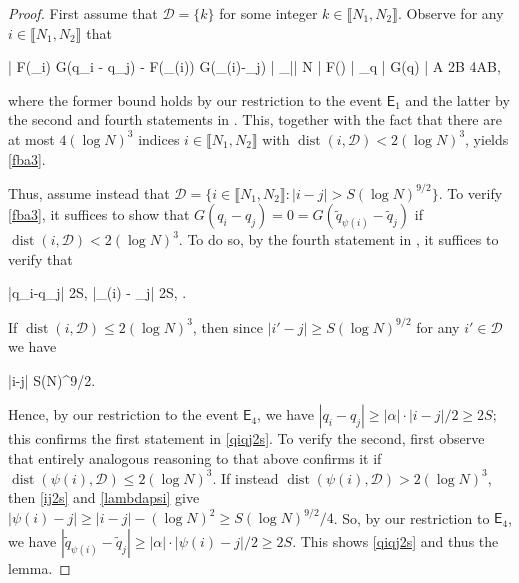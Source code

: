 \documentclass{amsart}
\numberwithin{equation}{section}
\DeclareMathOperator{\dist}{dist}
\theoremstyle{remark}
\theoremstyle{definition}
\begin{document}
	\begin{proof} 
		
		
		
		First assume that $\mathcal{D} = \{ k \}$ for some integer $k \in \llbracket N_1, N_2 \rrbracket$. Observe for any $i \in \llbracket N_1, N_2 \rrbracket$ that 
		\begin{flalign*} 
			\big| F(\Lambda_i) \cdot G(q_i - q_j) - F(\tilde{\Lambda}_{\psi(i)}) \cdot G(_{\psi(i)}-_j) \big|  \displaystyle\sup_{|\lambda| \le \log N} | F(\lambda) | \cdot \displaystyle\sup_{q \in {}} | G(q) |  \cdot A \cdot 2B \le 4AB,
		\end{flalign*}
		
		\noindent where the former bound holds by our restriction to the event $\mathsf{E}_1$ and the latter by the second and fourth statements in . This, together with the fact  that there are at most $4(\log N)^3$ indices $i \in \llbracket N_1, N_2 \rrbracket$ with $\dist (i, \mathcal{D}) < 2 (\log N)^3$, yields \eqref{fba3}.
		
		Thus, assume instead that $\mathcal{D} = \{ i \in \llbracket N_1, N_2 \rrbracket : |i-j| > S(\log N)^{9/2} \}$. To verify \eqref{fba3}, it suffices to show that $G(q_i - q_j) = 0 = G(\tilde{q}_{\psi(i)}-\tilde{q}_j)$ if $\dist (i, \mathcal{D}) < 2 (\log N)^3$. To do so, by the fourth statement in , it suffices to verify that 
		\begin{flalign} 
			\label{qiqj2s} 
			|q_i-q_j| \ge 2S, \qquad {} \qquad |_{\psi(i)} - _j| \ge 2S, \qquad \text{if $\dist (i, \mathcal{D}) \le 2(\log N)^3$}.
		\end{flalign}
		
		\noindent If $\dist (i, \mathcal{D}) \le 2(\log N)^3$, then since $|i'-j| \ge S(\log N)^{9/2}$ for any $i' \in \mathcal{D}$ we have 
		\begin{flalign}
			\label{ij2s}
			|i-j| \ge \displaystyle{} \cdot S(\log N)^{9/2}.
		\end{flalign} 
		
		\noindent Hence, by our restriction to the event $\mathsf{E}_4$, we have $|q_i - q_j| \ge |\alpha| \cdot |i-j| / 2 \ge 2 S$; this confirms the first statement in \eqref{qiqj2s}. To verify the second, first observe that entirely analogous reasoning to that above confirms it if $\dist (\psi(i), \mathcal{D}) \le 2 (\log N)^3$. If instead $\dist ( \psi(i), \mathcal{D} ) > 2 (\log N)^3$, then \eqref{ij2s} and \eqref{lambdapsi} give $| \psi(i)-j | \ge |i-j| - (\log N)^2 \ge S(\log N)^{9/2} / 4$. So, by our restriction to $\mathsf{E}_4$, we have $|\tilde{q}_{\psi(i)} - \tilde{q}_j| \ge |\alpha| \cdot | \psi(i)-j| / 2 \ge 2S$. This shows \eqref{qiqj2s} and thus the lemma.
	\end{proof} 
	
\end{document}

